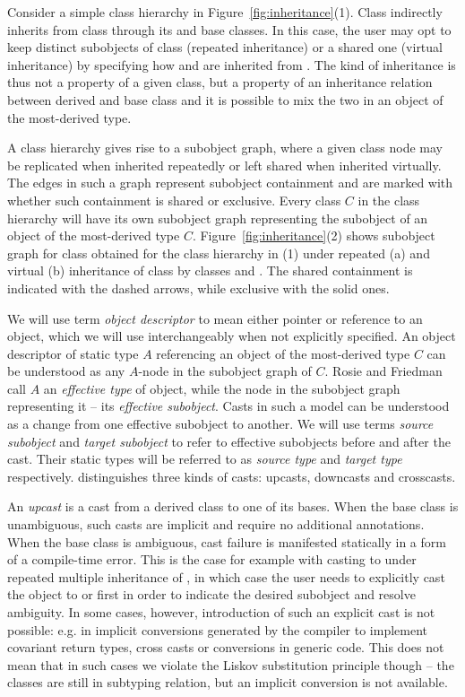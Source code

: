 \noindent
Consider a simple class hierarchy in Figure~\ref{fig:inheritance}(1). Class 
 indirectly inherits from class  through its  and 
 base classes. In this case, the user may opt to keep distinct 
subobjects of class  (repeated inheritance) or a shared one (virtual 
inheritance) by specifying how  and  are inherited from 
. The kind of inheritance is thus not a property of a given class, but a 
property of an inheritance relation between derived and base class and it is 
possible to mix the two in an object of the most-derived type. 

A class hierarchy gives rise to a subobject graph, 
where a given class node may be replicated when inherited repeatedly or left 
shared when inherited virtually. The edges in such a graph represent subobject 
containment and are marked with whether such containment is shared or 
exclusive. Every class $C$ in the class hierarchy will have its own subobject 
graph representing the subobject of an object of the most-derived type $C$.
Figure~\ref{fig:inheritance}(2) shows subobject graph for class  
obtained for the class hierarchy in (1) under repeated (a) and virtual (b) 
inheritance of class  by classes  and . The shared 
containment is indicated with the dashed arrows, while exclusive with the solid 
ones.

We will use term \emph{object descriptor} to mean either pointer or reference to 
an object, which we will use interchangeably when not explicitly specified. 
An object descriptor of static type $A$ referencing an object of the most-derived 
type $C$ can be understood as any \code{*::}$A$-node in the subobject graph of $C$. Rosie 
and Friedman call $A$ an \emph{effective type} of object, while the node in the 
subobject graph representing it -- its \emph{effective subobject}. 
Casts in such a model can be understood as a change from one effective subobject 
to another. We will use terms \emph{source subobject} and \emph{target 
subobject} to refer to effective subobjects before and after the cast. Their 
static types will be referred to as \emph{source type} and \emph{target type} 
respectively. \Cpp{} distinguishes three kinds of casts: upcasts, downcasts and 
crosscasts.

An \emph{upcast} is a cast from a derived class to one of its bases. When the 
base class is unambiguous, such casts are implicit and require no additional 
annotations. When the base class is ambiguous, cast failure is manifested 
statically in a form of a compile-time error. This is the case for example with 
casting  to  under repeated multiple inheritance of , 
in which case the user needs to explicitly cast the object to  or 
 first in order to indicate the desired subobject and resolve ambiguity. 
In some cases, however, introduction of such an explicit cast is not possible: 
e.g. in implicit conversions generated by the compiler to implement covariant 
return types, cross casts or conversions in generic code. This does not mean 
that in such cases we violate the Liskov substitution principle though -- the 
classes are still in subtyping relation, but an implicit conversion is not 
available.

